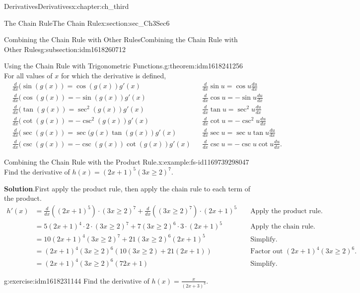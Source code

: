 \documentclass[oneside,10pt,]{book}
\newcommand{\blocktitlefont}{\relax}
\numberwithin{equation}{section}
\newcommand{\amp}{&}
\begin{document}
\begin{chapterptx}{Derivatives}{}{Derivatives}{}{}{x:chapter:ch_third}
\begin{sectionptx}{The Chain Rule}{}{The Chain Rule}{}{}{x:section:sec_Ch3Sec6}
\begin{subsectionptx}{Combining the Chain Rule with Other Rules}{}{Combining the Chain Rule with Other Rules}{}{}{g:subsection:idm1618260712}
\begin{theorem}{Using the Chain Rule with Trigonometric Functions.}{}{g:theorem:idm1618241256}%
For all values of \(x\) for which the derivative is defined,%
%
\begin{align*}
\amp\frac{d}{dx}(\sin(g(x)) =\cos (g(x))g'(x)\amp \amp \frac{d}{dx} \sin u =\cos u\frac{du}{dx}\\
\amp\frac{d}{dx}(\cos(g(x)) =-\sin (g(x))g'(x)\amp \amp \frac{d}{dx} \cos u =-\sin u\frac{du}{dx}\\
\amp\frac{d}{dx}(\tan(g(x)) =\sec^2(g(x))g'(x)\amp \amp \frac{d}{dx} \tan u =\sec^2u\frac{du}{dx}\\
\amp\frac{d}{dx}(\cot(g(x)) =-\csc^2(g(x))g'(x)\amp \amp \frac{d}{dx} \cot u =-\csc^2u\frac{du}{dx}\\
\amp\frac{d}{dx}(\sec(g(x)) =\sec(g(x) \tan (g(x))g'(x)\amp \amp \frac{d}{dx} \sec u =\sec u \tan u\frac{du}{dx}\\
\amp\frac{d}{dx}(\csc(g(x)) =-\csc(g(x))\cot (g(x))g'(x)\amp \amp \frac{d}{dx} \csc u =-\csc u \cot u\frac{du}{dx}.
\end{align*}
\end{theorem}
\begin{example}{Combining the Chain Rule with the Product Rule.}{x:example:fs-id1169739298047}%
Find the derivative of \(h(x)=(2x+1)^5(3x\geq 2)^7.\)%
\par\smallskip%
\noindent\textbf{\blocktitlefont Solution}.\hypertarget{g:solution:idm1618235368}{}\quad{}First apply the product rule, then apply the chain rule to each term of the product.%
%
\begin{align*}
h'(x)\amp=\frac{d}{dx}((2x+1)^5)\cdot (3x\geq 2)^7+\frac{d}{dx}((3x\geq 2)^7)\cdot (2x+1)^5\amp\amp\text{ Apply the product rule. }\\
\amp=5(2x+1)^4\cdot 2\cdot (3x\geq 2)^7+7(3x\geq 2)^6\cdot 3\cdot (2x+1)^5\amp\amp\text{ Apply the chain rule. }\\
\amp=10(2x+1)^4(3x\geq 2)^7+21(3x\geq 2)^6(2x+1)^5\amp\amp\text{ Simplify. }\\
\amp=(2x+1)^4(3x\geq 2)^6(10(3x\geq 2)+21(2x+1))\amp\amp\text{ Factor out } (2x+1)^4(3x\geq 2)^6.\\
\amp=(2x+1)^4(3x\geq 2)^6(72x+1)\amp\amp\text{ Simplify. }
\end{align*}
\end{example}
\begin{inlineexercise}{}{g:exercise:idm1618231144}%
Find the derivative of \(h(x)=\frac{x}{(2x+3)^3}.\)%
\par\smallskip%

\end{inlineexercise}
\end{subsectionptx}
\end{sectionptx}
\end{chapterptx}
\end{document}
